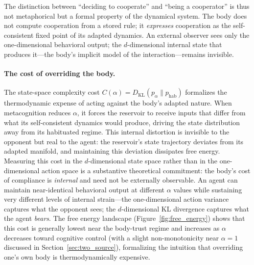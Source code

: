 \documentclass[11pt,a4paper]{article}
\theoremstyle{definition}
\newcommand{\KL}{D_{\mathrm{KL}}}
\begin{document}
The distinction between ``deciding to cooperate'' and ``being a
cooperator'' \citep{frank1988} is thus not metaphorical but a formal
property of the dynamical system.  The body does not compute cooperation
from a stored rule; it \emph{expresses} cooperation as the self-consistent
fixed point of its adapted dynamics.  An external observer sees only the
one-dimensional behavioral output; the $d$-dimensional internal state
that produces it---the body's implicit model of the interaction---remains
invisible.

\paragraph{The cost of overriding the body.}
The state-space complexity cost $C(\alpha) = \KL(p_{\alpha} \| p_{\mathrm{hab}})$
formalizes the thermodynamic expense of acting against the body's adapted
nature.  When metacognition reduces $\alpha$, it forces the reservoir to
receive inputs that differ from what its self-consistent dynamics would
produce, driving the state distribution away from its habituated regime.
This internal distortion is invisible to the opponent but real to the
agent: the reservoir's state trajectory deviates from its adapted manifold,
and maintaining this deviation dissipates free energy.
Measuring this cost in the $d$-dimensional state space rather than in
the one-dimensional action space is a substantive theoretical commitment:
the body's cost of compliance is \emph{internal} and need not be
externally observable.  An agent can maintain near-identical behavioral
output at different $\alpha$ values while sustaining very different
levels of internal strain---the one-dimensional action variance captures
what the opponent sees; the $d$-dimensional KL divergence captures what
the agent \emph{bears}.
The free energy
landscape (Figure~\ref{fig:free_energy}) shows that this cost is
generally lowest near the body-trust regime and increases as $\alpha$
decreases toward cognitive control (with a slight non-monotonicity
near $\alpha = 1$ discussed in Section~\ref{sec:two_source}),
formalizing the intuition that overriding one's own body is
thermodynamically expensive.
\end{document}
